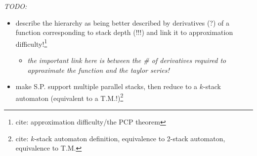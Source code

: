 \documentclass[10pt]{article}
\newcommand{\todocite}[1]{\footnote{cite: #1}}
\begin{document}
\textit{TODO:}
\begin{itemize}
\item describe the hierarchy as being better described by derivatives (?) of a function corresponding to stack depth (!!!) and link it to approximation difficulty!\todocite{approximation difficulty/the PCP theorem}
\begin{itemize}
\item \textit{the important link here is between the \# of derivatives required to approximate the function and the taylor series!}
\end{itemize}
\item make S.P. support multiple parallel stacks, then reduce  to a $k$-stack automaton (equivalent to a T.M.!)\todocite{$k$-stack automaton definition, equivalence to 2-stack automaton, equivalence to T.M.}
\end{itemize}

\newpage
\printbibliography
\end{document}
